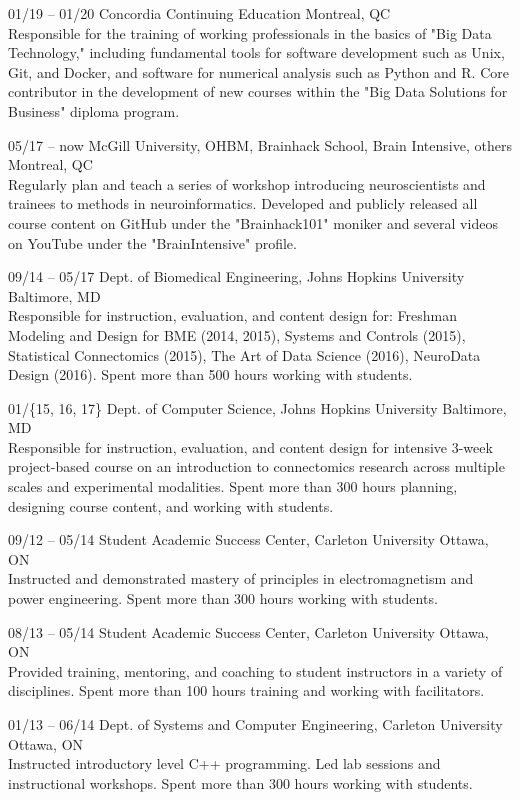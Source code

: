\documentclass[]{friggeri-cv} %
\begin{document}
\begin{entrylist}
\entry
{01/19 -- 01/20}
{Concordia Continuing Education}
{Montreal, QC}
{ \\
Responsible for the training of working professionals in the basics of "Big Data Technology," including fundamental
tools for software development such as Unix, Git, and Docker, and software for numerical analysis such as Python and R.
Core contributor in the development of new courses within the "Big Data Solutions for Business" diploma program.}

\entry
{05/17 -- now}
{McGill University, OHBM, Brainhack School, Brain Intensive, others}
{Montreal, QC}
{ \\
Regularly plan and teach a series of workshop introducing neuroscientists and trainees to methods in neuroinformatics.
Developed and publicly released all course content on GitHub under the "Brainhack101" moniker and several videos on
YouTube under the "BrainIntensive" profile.}

\entry
{09/14 -- 05/17}
{Dept. of Biomedical Engineering, Johns Hopkins University}
{Baltimore, MD}
{ \\
Responsible for instruction, evaluation, and content design for: Freshman Modeling and Design
for BME (2014, 2015), Systems and Controls (2015), Statistical Connectomics (2015), The Art of
Data Science (2016), NeuroData Design (2016). Spent more than 500 hours working with students.}

\entry
{01/\{15, 16, 17\}}
{Dept. of Computer Science, Johns Hopkins University}
{Baltimore, MD}
{\\
Responsible for instruction, evaluation, and content design for intensive 3-week project-based course on an
introduction to connectomics research across multiple scales and experimental modalities. Spent more than 300 hours
planning, designing course content, and working with students.}

\entry
{09/12 -- 05/14}
{Student Academic Success Center, Carleton University}
{Ottawa, ON}
{\\
Instructed and demonstrated mastery of principles in electromagnetism and power engineering. Spent more than 300 hours
working with students.}
\end{entrylist}

\begin{entrylist}
\entry
{08/13 -- 05/14}
{Student Academic Success Center, Carleton University}
{Ottawa, ON}
{\\
Provided training, mentoring, and coaching to student instructors in a variety of disciplines. Spent more than 100
hours training and working with facilitators.}

\entry
{01/13 -- 06/14}
{Dept. of Systems and Computer Engineering, Carleton University}
{Ottawa, ON}
{\\
Instructed introductory level C++ programming. Led lab sessions and instructional workshops. Spent more than 300 hours
working with students.}
\end{entrylist}
\end{document}
